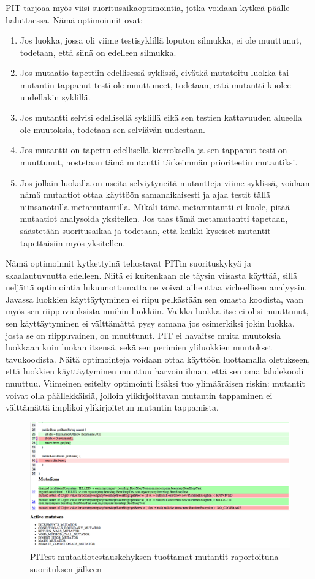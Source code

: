 \documentclass[finnish]{tktltiki2}
\begin{document}
PIT tarjoaa myös viisi suoritusaikaoptimointia, jotka voidaan kytkeä päälle haluttaessa. Nämä optimoinnit ovat:
\begin{enumerate}
	\item Jos luokka, jossa oli viime testisyklillä loputon silmukka, ei ole muuttunut, todetaan, että siinä on edelleen silmukka.
	\item Jos mutaatio tapettiin edellisessä syklissä, eivätkä mutatoitu luokka tai mutantin tappanut testi ole muuttuneet, todetaan, että mutantti kuolee uudellakin syklillä.
	\item Jos mutantti selvisi edellisellä syklillä eikä sen testien kattavuuden alueella ole muutoksia, todetaan sen selviävän uudestaan. 
	\item Jos mutantti on tapettu edellisellä kierroksella ja sen tappanut testi on muuttunut, nostetaan tämä mutantti tärkeimmän prioriteetin mutantiksi.
	\item Jos jollain luokalla on useita selviytyneitä mutantteja viime syklissä, voidaan nämä mutaatiot ottaa käyttöön samanaikaisesti ja ajaa testit tällä niinsanotulla metamutantilla. Mikäli tämä metamutantti ei kuole, pitää mutaatiot analysoida yksitellen. Jos taas tämä metamutantti tapetaan, säästetään suoritusaikaa ja todetaan, että kaikki kyseiset mutantit tapettaisiin myös yksitellen.
\end{enumerate}
Nämä optimoinnit kytkettyinä tehostavat PITin suorituskykyä ja skaalautuvuutta edelleen. Niitä ei kuitenkaan ole täysin viisasta käyttää, sillä neljättä optimointia lukuunottamatta ne voivat aiheuttaa virheellisen analyysin. Javassa luokkien käyttäytyminen ei riipu pelkästään sen omasta koodista, vaan myös sen riippuvuuksista muihin luokkiin. Vaikka luokka itse ei olisi muuttunut, sen käyttäytyminen ei välttämättä pysy samana jos esimerkiksi jokin luokka, josta se on riippuvainen, on muuttunut. PIT ei havaitse muita muutoksia luokkaan kuin luokan itsensä, sekä sen perimien yliluokkien muutokset tavukoodista. Näitä optimointeja voidaan ottaa käyttöön luottamalla oletukseen, että luokkien käyttäytyminen muuttuu harvoin ilman, että sen oma lähdekoodi muuttuu. Viimeinen esitelty optimointi lisäksi tuo ylimääräisen riskin: mutantit voivat olla päällekkäisiä, jolloin ylikirjoittavan mutantin tappaminen ei välttämättä implikoi ylikirjoitetun mutantin tappamista.
\begin{figure}[here]
\centering
\caption{PITest mutaatiotestauskehyksen tuottamat mutantit raportoituna suorituksen jälkeen}
\label{fig:mutantit}
\includegraphics[scale=0.4]{freimarikuvat/mutantit.png}
\end{figure}
\end{document}
